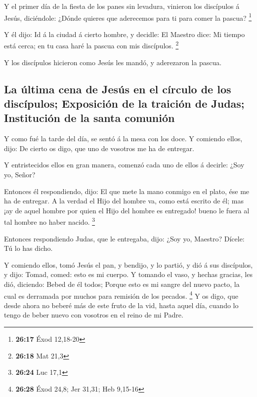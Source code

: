  Y el primer día de la fiesta de los panes sin levadura,
vinieron los discípulos á Jesús, diciéndole: ¿Dónde quieres que
aderecemos para ti para comer la pascua? \footnote{\textbf{26:17} Éxod
  12,18-20}

 Y él dijo: Id á la ciudad á cierto hombre, y decidle: El
Maestro dice: Mi tiempo está cerca; en tu casa haré la pascua con mis
discípulos. \footnote{\textbf{26:18} Mat 21,3}

 Y los discípulos hicieron como Jesús les mandó, y
aderezaron la pascua.

\hypertarget{la-uxfaltima-cena-de-jesuxfas-en-el-cuxedrculo-de-los-discuxedpulos-exposiciuxf3n-de-la-traiciuxf3n-de-judas-instituciuxf3n-de-la-santa-comuniuxf3n}{%
\subsection{La última cena de Jesús en el círculo de los discípulos;
Exposición de la traición de Judas; Institución de la santa
comunión}\label{la-uxfaltima-cena-de-jesuxfas-en-el-cuxedrculo-de-los-discuxedpulos-exposiciuxf3n-de-la-traiciuxf3n-de-judas-instituciuxf3n-de-la-santa-comuniuxf3n}}

 Y como fué la tarde del día, se sentó á la mesa con los
doce.  Y comiendo ellos, dijo: De cierto os digo, que uno
de vosotros me ha de entregar.

 Y entristecidos ellos en gran manera, comenzó cada uno
de ellos á decirle: ¿Soy yo, Señor?

 Entonces él respondiendo, dijo: El que mete la mano
conmigo en el plato, ése me ha de entregar.  A la verdad
el Hijo del hombre va, como está escrito de él; mas ¡ay de aquel hombre
por quien el Hijo del hombre es entregado! bueno le fuera al tal hombre
no haber nacido. \footnote{\textbf{26:24} Luc 17,1}

 Entonces respondiendo Judas, que le entregaba, dijo:
¿Soy yo, Maestro? Dícele: Tú lo has dicho.

 Y comiendo ellos, tomó Jesús el pan, y bendijo, y lo
partió, y dió á sus discípulos, y dijo: Tomad, comed: esto es mi cuerpo.
 Y tomando el vaso, y hechas gracias, les dió, diciendo:
Bebed de él todos;  Porque esto es mi sangre del nuevo
pacto, la cual es derramada por muchos para remisión de los pecados.
\footnote{\textbf{26:28} Éxod 24,8; Jer 31,31; Heb 9,15-16}
 Y os digo, que desde ahora no beberé más de este fruto
de la vid, hasta aquel día, cuando lo tengo de beber nuevo con vosotros
en el reino de mi Padre.

